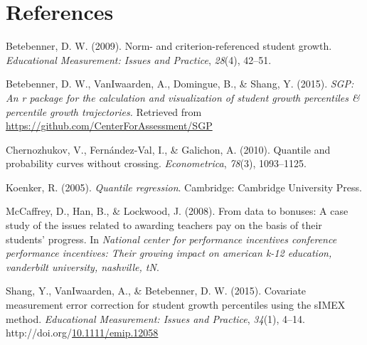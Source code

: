 \documentclass[12pt]{article}
\begin{document}
\section*{References}\label{references}

Betebenner, D. W. (2009). Norm- and criterion-referenced student growth.
\emph{Educational Measurement: Issues and Practice}, \emph{28}(4),
42--51.

Betebenner, D. W., {VanIwaarden}, A., Domingue, B., \& Shang, Y. (2015).
\emph{SGP: An r package for the calculation and visualization of student
growth percentiles \& percentile growth trajectories.} Retrieved from
\url{https://github.com/CenterForAssessment/SGP}

Chernozhukov, V., Fern{á}ndez-Val, I., \& Galichon, A. (2010). Quantile
and probability curves without crossing. \emph{Econometrica},
\emph{78}(3), 1093--1125.

Koenker, R. (2005). \emph{Quantile regression}. Cambridge: Cambridge
University Press.

McCaffrey, D., Han, B., \& Lockwood, J. (2008). From data to bonuses: A
case study of the issues related to awarding teachers pay on the basis
of their students' progress. In \emph{National center for performance
incentives conference performance incentives: Their growing impact on
american k-12 education, vanderbilt university, nashville, tN}.

Shang, Y., VanIwaarden, A., \& Betebenner, D. W. (2015). Covariate
measurement error correction for student growth percentiles using the
sIMEX method. \emph{Educational Measurement: Issues and Practice},
\emph{34}(1), 4--14.
http://doi.org/\href{http://dx.doi.org/10.1111/emip.12058}{10.1111/emip.12058}



\end{document}
